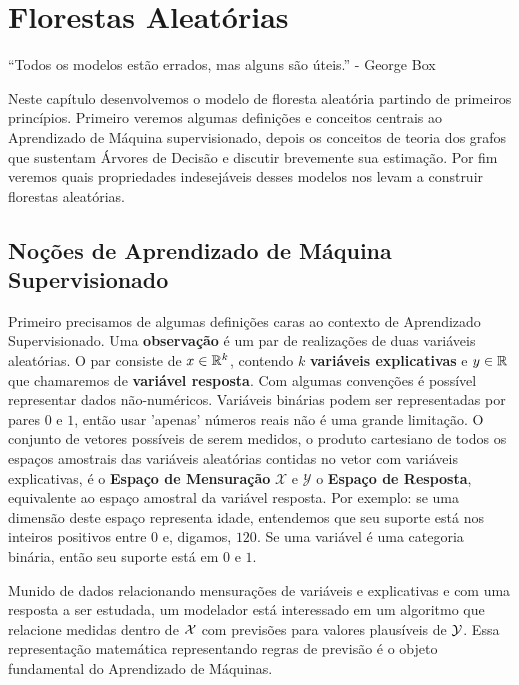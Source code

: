 
\chapter{Florestas Aleatórias}

\begin{citacao}
	``Todos os modelos estão errados, mas alguns são úteis.''  - George Box
\end{citacao}

Neste capítulo desenvolvemos o modelo de floresta aleatória partindo de primeiros princípios. Primeiro veremos algumas definições e conceitos centrais ao Aprendizado de Máquina supervisionado, depois os conceitos de teoria dos grafos que sustentam Árvores de Decisão e discutir brevemente sua estimação. Por fim veremos quais propriedades indesejáveis desses modelos nos levam a construir florestas aleatórias. 

\section{Noções de Aprendizado de Máquina Supervisionado}

Primeiro precisamos de algumas definições caras ao contexto de Aprendizado Supervisionado. Uma \textbf{observação} é um par de realizações de duas variáveis aleatórias. O par consiste de $x \in \mathbb{R}^k$, contendo $k$ \textbf{variáveis explicativas} e $y \in \mathbb{R}$ que chamaremos de \textbf{variável resposta}. Com algumas convenções é possível representar dados não-numéricos. Variáveis binárias podem ser representadas por pares $0$ e $1$, então usar 'apenas' números reais não é uma grande limitação. O conjunto de vetores possíveis de serem medidos, o produto cartesiano de todos os espaços amostrais das variáveis aleatórias contidas no vetor com variáveis explicativas, é o \textbf{Espaço de Mensuração} $\mathcal{X}$ e $\mathcal{Y}$ o \textbf{Espaço de Resposta}, equivalente ao espaço amostral da variável resposta. Por exemplo: se uma dimensão deste espaço representa idade, entendemos que seu suporte está nos inteiros positivos entre $0$ e, digamos, $120$. Se uma variável é uma categoria binária, então seu suporte está em $0$ e $1$. 

Munido de dados relacionando mensurações de variáveis e explicativas e com uma resposta a ser estudada, um modelador está interessado em um algoritmo que relacione medidas dentro de $\mathcal{X}$ com previsões para valores plausíveis de $\mathcal{Y}$. Essa representação matemática representando regras de previsão é o objeto fundamental do Aprendizado de Máquinas.

